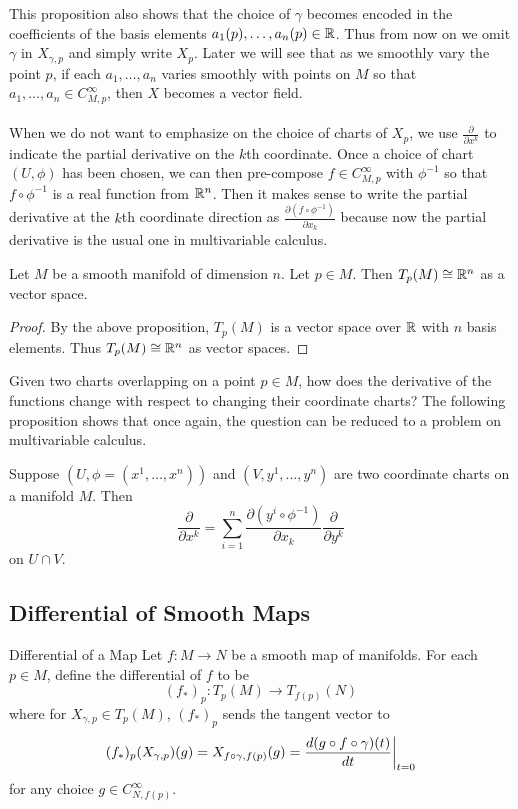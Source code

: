 \documentclass[a4paper]{article}
\begin{document}
This proposition also shows that the choice of $\gamma$ becomes encoded in the coefficients of the basis elements $a_1(p),\dots,a_n(p)\in\mathbb{R}$. Thus from now on we omit $\gamma$ in $X_{\gamma,p}$ and simply write $X_p$. Later we will see that as we smoothly vary the point $p$, if each $a_1,\dots,a_n$ varies smoothly with points on $M$ so that $a_1,\dots,a_n\in C_{M,p}^\infty$, then $X$ becomes a vector field. \\~\\

When we do not want to emphasize on the choice of charts of $X_p$, we use $\frac{\partial}{\partial x^k}$ to indicate the partial derivative on the $k$th coordinate. Once a choice of chart $(U,\phi)$ has been chosen, we can then pre-compose $f\in C_{M,p}^\infty$ with $\phi^{-1}$ so that $f\circ\phi^{-1}$ is a real function from $\mathbb{R}^n$. Then it makes sense to write the partial derivative at the $k$th coordinate direction as $\frac{\partial(f\circ\phi^{-1})}{\partial x_k}$ because now the partial derivative is the usual one in multivariable calculus. 

\begin{crl}{}{} Let $M$ be a smooth manifold of dimension $n$. Let $p\in M$. Then $T_p(M)\cong\mathbb{R}^n$ as a vector space. \tcbline
\begin{proof}
By the above proposition, $T_p(M)$ is a vector space over $\mathbb{R}$ with $n$ basis elements. Thus $T_p(M)\cong\mathbb{R}^n$ as vector spaces. 
\end{proof}
\end{crl}

Given two charts overlapping on a point $p\in M$, how does the derivative of the functions change with respect to changing their coordinate charts? The following proposition shows that once again, the question can be reduced to a problem on multivariable calculus. 

\begin{prp}{}{} Suppose $(U,\phi=(x^1,\dots,x^n))$ and $(V,y^1,\dots,y^n)$ are two coordinate charts on a manifold $M$. Then $$\frac{\partial}{\partial x^k}=\sum_{i=1}^n\frac{\partial(y^i\circ\phi^{-1})}{\partial x_k}\frac{\partial}{\partial y^k}$$ on $U\cap V$. 
\end{prp}

\subsection{Differential of Smooth Maps}
\begin{defn}{Differential of a Map}{} Let $f:M\to N$ be a smooth map of manifolds. For each $p\in M$, define the differential of $f$ to be $$(f_\ast)_p:T_p(M)\to T_{f(p)}(N)$$ where for $X_{\gamma,p}\in T_p(M)$, $(f_\ast)_p$ sends the tangent vector to $$(f_\ast)_p(X_{\gamma,p})(g)=X_{f\circ\gamma,f(p)}(g)=\frac{d(g\circ f\circ\gamma)(t)}{dt}\bigg{|}_{t=0}$$ for any choice $g\in C_{N,f(p)}^\infty$. 
\end{defn}
\end{document}
